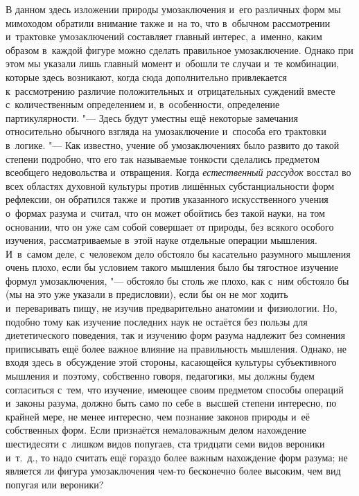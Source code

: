 
В данном здесь изложении природы умозаключения и~его различных
форм мы мимоходом обратили внимание также и~на то, что в~обычном
рассмотрении и~трактовке умозаключений составляет главный
интерес, а~именно, каким образом в~каждой фигуре можно сделать правильное
умозаключение. Однако при этом мы указали лишь главный момент и~обошли те
случаи и~те комбинации, которые здесь возникают, когда сюда дополнительно
привлекается к~рассмотрению различие положительных и~отрицательных суждений
вместе с~количественным определением и, в~особенности, определение
партикулярности. "--- Здесь будут уместны ещё некоторые
замечания относительно обычного взгляда на умозаключение и~способа его
трактовки в~логике. "--- Как известно, учение об умозаключениях
было развито до такой степени подробно, что его так называемые тонкости
сделались предметом всеобщего недовольства и~отвращения. Когда
{\em естественный рассудок}
восстал во всех областях духовной культуры против лишённых
субстанциальности форм рефлексии, он обратился также и~против указанного
искусственного учения о~формах разума и~считал, что он может обойтись без
такой науки, на том основании, что он уже сам собой совершает от природы,
без всякого особого изучения, рассматриваемые в~этой науке отдельные
операции мышления. И~в~самом деле, с~человеком дело обстояло бы касательно
разумного мышления очень плохо, если бы условием такого мышления было бы
тягостное изучение формул умозаключения, "--- обстояло бы столь
же плохо, как с~ним обстояло бы (мы на это уже указали в
предисловии),
если бы он не мог ходить и~переваривать пищу, не изучив
предварительно анатомии и~физиологии. Но, подобно тому как изучение
последних наук не остаётся без пользы для диететического поведения, так и
изучению форм разума надлежит без сомнения приписывать ещё более важное
влияние на правильность мышления. Однако, не входя здесь в~обсуждение этой
стороны, касающейся культуры субъективного мышления и~поэтому, собственно
говоря, педагогики, мы должны будем согласиться с~тем, что изучение,
имеющее своим предметом способы операций и~законы разума, должно быть само
по себе в~высшей степени интересно, по крайней мере, не менее интересно,
чем познание законов природы и~её собственных форм. Если признаётся
немаловажным делом нахождение шестидесяти с~лишком видов попугаев, ста
тридцати семи видов вероники и~т.~д., то надо считать ещё гораздо более
важным нахождение форм разума; не является ли фигура умозаключения чем-то
бесконечно более высоким, чем вид попугая или вероники?

